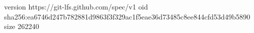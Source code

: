 version https://git-lfs.github.com/spec/v1
oid sha256:ea6746d247b782881d9863f3f329ac1f5eae36d73485c8ee844cfd53d49b5890
size 262240

